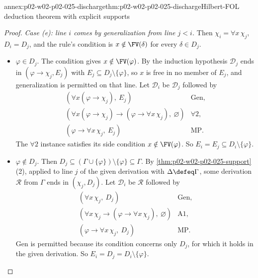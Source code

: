 \begin{annexitem}{annex:p02-w02-p02-025-discharge}{thm:p02-w02-p02-025-discharge}{Hilbert-FOL deduction theorem with explicit supports}
\begin{proof}
\emph{Case (e): line \(i\) comes by generalization from line \(j<i\).}
Then \(\chi_i=\forall x\,\chi_j\), \(D_i=D_j\), and the rule's condition is
\(x\notin\FV(\delta)\) for every \(\delta\in D_j\).
\begin{itemize}
  \item[(e1)] \(\varphi\in D_j\).  The condition gives
        \(x\notin\FV(\varphi)\).  By the induction hypothesis
        \(\mathcal D_j\) ends in \((\varphi\to\chi_j,E_j)\) with
        \(E_j\subseteq D_j\setminus\{\varphi\}\), so \(x\) is free in no
        member of \(E_j\), and generalization is permitted on that line.
        Let \(\mathcal D_i\) be \(\mathcal D_j\) followed by
        \[
        \begin{array}{ll}
          (\forall x(\varphi\to\chi_j),\ E_j) & \text{Gen},\\
          (\forall x(\varphi\to\chi_j)\to(\varphi\to\forall x\,\chi_j),\
            \varnothing) & \forall2,\\
          (\varphi\to\forall x\,\chi_j,\ E_j) & \text{MP}.
        \end{array}
        \]
        The \(\forall2\) instance satisfies its side condition
        \(x\notin\FV(\varphi)\).  So \(E_i=E_j\subseteq D_i\setminus\{\varphi\}\).
  \item[(e2)] \(\varphi\notin D_j\).  Then
        \(D_j\subseteq(\Gamma\cup\{\varphi\})\setminus\{\varphi\}
        \subseteq\Gamma\).  By \cref{thm:p02-w02-p02-025-support}(2),
        applied to line \(j\) of the given derivation with
        \(\Delta\defeq\Gamma\), some derivation \(\mathcal R\) from
        \(\Gamma\) ends in \((\chi_j,D_j)\).  Let \(\mathcal D_i\) be
        \(\mathcal R\) followed by
        \[
        \begin{array}{ll}
          (\forall x\,\chi_j,\ D_j) & \text{Gen},\\
          (\forall x\,\chi_j\to(\varphi\to\forall x\,\chi_j),\ \varnothing)
            & \text{A1},\\
          (\varphi\to\forall x\,\chi_j,\ D_j) & \text{MP}.
        \end{array}
        \]
        Gen is permitted because its condition concerns only \(D_j\), for
        which it holds in the given derivation.  So
        \(E_i=D_j=D_i\setminus\{\varphi\}\).
\end{itemize}


\end{proof}
\end{annexitem}
